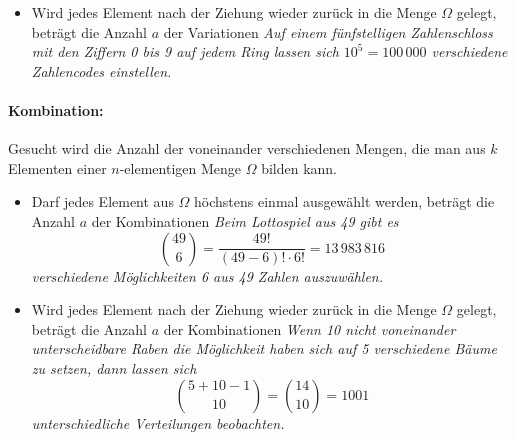 \hfill
\begin{minipage}[t]{0.45\textwidth}
  \begin{itemize}
    \item Wird jedes Element nach der Ziehung wieder zurück in die Menge $\Omega$
          gelegt, beträgt die Anzahl $a$ der Variationen
          \newline
          \textit{Auf einem fünfstelligen Zahlenschloss mit den Ziffern 0 bis 9
          auf jedem Ring lassen sich $10^{5}=100\,000$ verschiedene Zahlencodes
          einstellen.}
  \end{itemize}
  \paragraph{Kombination:} Gesucht wird die Anzahl der voneinander
  verschiedenen Mengen, die man aus $k$ Elementen einer $n$-elementigen
  Menge $\Omega$ bilden kann.
  \begin{itemize}
    \item Darf jedes Element aus $\Omega$ höchstens einmal ausgewählt
          werden, beträgt die Anzahl $a$ der Kombinationen\medskip
          \newline
          \textit{Beim Lottospiel  aus 49\grqq{} gibt es}
          \begin{equation*}
            \binom{49}{6}=\frac{49!}{(49-6)!\cdot 6!}=13\,983\,816
          \end{equation*}
          \textit{verschiedene Möglichkeiten 6 aus 49 Zahlen auszuwählen.}
    \item Wird jedes Element nach der Ziehung wieder zurück in die Menge $\Omega$
          gelegt, beträgt die Anzahl $a$ der Kombinationen\medskip
          \newline
          \textit{Wenn 10 nicht voneinander unterscheidbare Raben die Möglichkeit
          haben sich auf 5 verschiedene Bäume zu setzen, dann lassen sich}
          \begin{equation*}
            \binom{5+10-1}{10}=\binom{14}{10}=1001
          \end{equation*}
          \textit{unterschiedliche Verteilungen beobachten.}
  \end{itemize}
\end{minipage}

